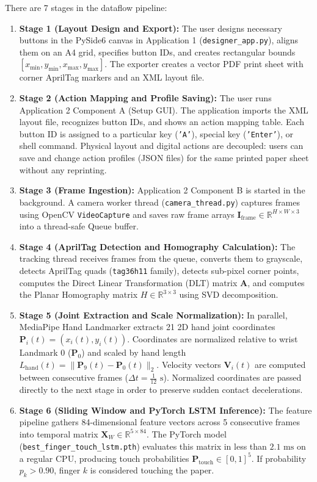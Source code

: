 There are 7 stages in the dataflow pipeline:
\begin{enumerate}
    \item \textbf{Stage 1 (Layout Design and Export):} The user designs necessary buttons in the PySide6 canvas in Application 1 (\texttt{designer\_app.py}), aligns them on an A4 grid, specifies button IDs, and creates rectangular bounds $[x_{\min}, y_{\min}, x_{\max}, y_{\max}]$. The exporter creates a vector PDF print sheet with corner AprilTag markers and an XML layout file.
    \item \textbf{Stage 2 (Action Mapping and Profile Saving):} The user runs Application 2 Component A (Setup GUI). The application imports the XML layout file, recognizes button IDs, and shows an action mapping table. Each button ID is assigned to a particular key (\texttt{'A'}), special key (\texttt{'Enter'}), or shell command. Physical layout and digital actions are decoupled: users can save and change action profiles (JSON files) for the same printed paper sheet without any reprinting.
    \item \textbf{Stage 3 (Frame Ingestion):} Application 2 Component B is started in the background. A camera worker thread (\texttt{camera\_thread.py}) captures frames using OpenCV \texttt{VideoCapture} and saves raw frame arrays $\mathbf{I}_{\text{frame}} \in \mathbb{R}^{H \times W \times 3}$ into a thread-safe Queue buffer.
    \item \textbf{Stage 4 (AprilTag Detection and Homography Calculation):} The tracking thread receives frames from the queue, converts them to grayscale, detects AprilTag quads (\texttt{tag36h11} family), detects sub-pixel corner points, computes the Direct Linear Transformation (DLT) matrix $\mathbf{A}$, and computes the Planar Homography matrix $H \in \mathbb{R}^{3 \times 3}$ using SVD decomposition.
    \item \textbf{Stage 5 (Joint Extraction and Scale Normalization):} In parallel, MediaPipe Hand Landmarker extracts 21 2D hand joint coordinates $\mathbf{P}_i(t) = (x_i(t), y_i(t))$. Coordinates are normalized relative to wrist Landmark 0 ($\mathbf{P}_0$) and scaled by hand length $L_{\text{hand}}(t) = \|\mathbf{P}_9(t) - \mathbf{P}_0(t)\|_2$. Velocity vectors $\mathbf{V}_i(t)$ are computed between consecutive frames ($\Delta t = \frac{1}{12}\text{ s}$). Normalized coordinates are passed directly to the next stage in order to preserve sudden contact decelerations.
    \item \textbf{Stage 6 (Sliding Window and PyTorch LSTM Inference):} The feature pipeline gathers 84-dimensional feature vectors across 5 consecutive frames into temporal matrix $\mathbf{X}_W \in \mathbb{R}^{5 \times 84}$. The PyTorch model (\texttt{best\_finger\_touch\_lstm.pth}) evaluates this matrix in less than $2.1\text{ ms}$ on a regular CPU, producing touch probabilities $\mathbf{P}_{\text{touch}} \in [0, 1]^5$. If probability $p_k > 0.90$, finger $k$ is considered touching the paper.

\end{enumerate}
